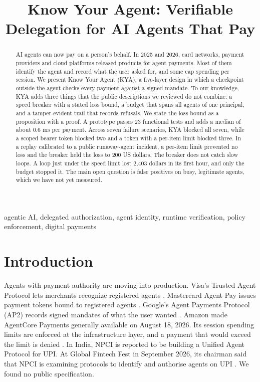 \documentclass[conference]{IEEEtran}
\begin{document}
\title{Know Your Agent: Verifiable Delegation for AI Agents That Pay}
\author{
}
\maketitle
\begin{abstract}
AI agents can now pay on a person's behalf. In 2025 and 2026, card networks, payment providers and cloud platforms released products for agent payments. Most of them identify the agent and record what the user asked for, and some cap spending per session. We present Know Your Agent (KYA), a five-layer design in which a checkpoint outside the agent checks every payment against a signed mandate. To our knowledge, KYA adds three things that the public descriptions we reviewed do not combine: a speed breaker with a stated loss bound, a budget that spans all agents of one principal, and a tamper-evident trail that records refusals. We state the loss bound as a proposition with a proof. A prototype passes 23 functional tests and adds a median of about 0.6 ms per payment. Across seven failure scenarios, KYA blocked all seven, while a scoped bearer token blocked two and a token with a per-item limit blocked three. In a replay calibrated to a public runaway-agent incident, a per-item limit prevented no loss and the breaker held the loss to 200 US dollars. The breaker does not catch slow loops. A loop just under the speed limit lost 2,403 dollars in its first hour, and only the budget stopped it. The main open question is false positives on busy, legitimate agents, which we have not yet measured.
\end{abstract}
\begin{IEEEkeywords}
agentic AI, delegated authorization, agent identity, runtime verification, policy enforcement, digital payments
\end{IEEEkeywords}

\section{Introduction}

Agents with payment authority are moving into production. Visa's Trusted Agent Protocol lets merchants recognize registered agents \cite{b1}. Mastercard Agent Pay issues payment tokens bound to registered agents \cite{b2}. Google's Agent Payments Protocol (AP2) records signed mandates of what the user wanted \cite{b3}. Amazon made AgentCore Payments generally available on August 18, 2026. Its session spending limits are enforced at the infrastructure layer, and a payment that would exceed the limit is denied \cite{b4}. In India, NPCI is reported to be building a Unified Agent Protocol for UPI. At Global Fintech Fest in September 2026, its chairman said that NPCI is examining protocols to identify and authorise agents on UPI \cite{b5}. We found no public specification.
\end{document}
